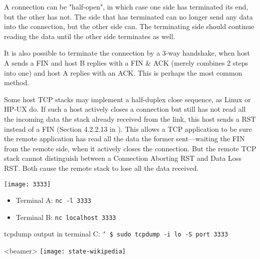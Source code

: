 A connection can be "half-open", in which case one side has terminated its end, but the
other has not. The side that has terminated can no longer send any data into the
connection, but the other side can. The terminating side should continue reading the data
until the other side terminates as well.

It is also possible to terminate the connection by a 3-way handshake, when host A sends a
FIN and host B replies with a FIN \& ACK (merely combines 2 steps into one) and host A
replies with an ACK. This is perhaps the most common method.

Some host TCP stacks may implement a half-duplex close sequence, as Linux or HP-UX do. If
such a host actively closes a connection but still has not read all the incoming data the
stack already received from the link, this host sends a RST instead of a FIN (Section
4.2.2.13 in ). This allows a TCP application to be sure the
remote application has read all the data the former sent—waiting the FIN from the remote
side, when it actively closes the connection. But the remote TCP stack cannot distinguish
between a Connection Aborting RST and Data Loss RST. Both cause the remote stack to lose
all the data received.


\begin{frame}%
  \begin{minipage}{.2\linewidth}
    \texttt{[image: 3333]}
  \end{minipage}
  \begin{minipage}{.78\linewidth}
    \begin{itemize}
    \item Terminal A: \texttt{nc -l 3333}
    \item Terminal B: \texttt{nc localhost 3333}
    \end{itemize}
  \end{minipage}
  \begin{iblock}{tcpdump output in terminal C:}
    \texttt{\char`~\$ sudo tcpdump -i lo -S port 3333}
    \centering
    \mode<beamer>{ \texttt{[image: tcpdump]} }%
  \end{iblock}
\end{frame}


\begin{frame}<beamer>
  \centering
  \texttt{[image: state-wikipedia]}
\end{frame}

